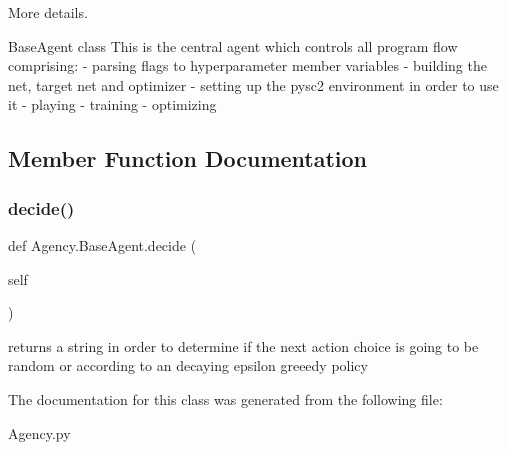 More details. \begin{DoxyVerb}BaseAgent class
This is the central agent which controls all program flow comprising:
  - parsing flags to hyperparameter member variables
  - building the net, target net and optimizer
  - setting up the pysc2 environment in order to use it
  - playing
  - training
  - optimizing
\end{DoxyVerb}
 

\subsection{Member Function Documentation}
\mbox{\label{classAgency_1_1BaseAgent_a901aab539081be07996dca97de2f2e06}} 
\subsubsection{\texorpdfstring{decide()}{decide()}}
{\footnotesize\ttfamily def Agency.\+Base\+Agent.\+decide (\begin{DoxyParamCaption}\item[{}]{self }\end{DoxyParamCaption})}

\begin{DoxyVerb}returns a string in order to determine if the next action choice is
going to be random or according to an decaying epsilon greeedy policy
\end{DoxyVerb}
 

The documentation for this class was generated from the following file\+:\begin{DoxyCompactItemize}
\item 
Agency.\+py\end{DoxyCompactItemize}
